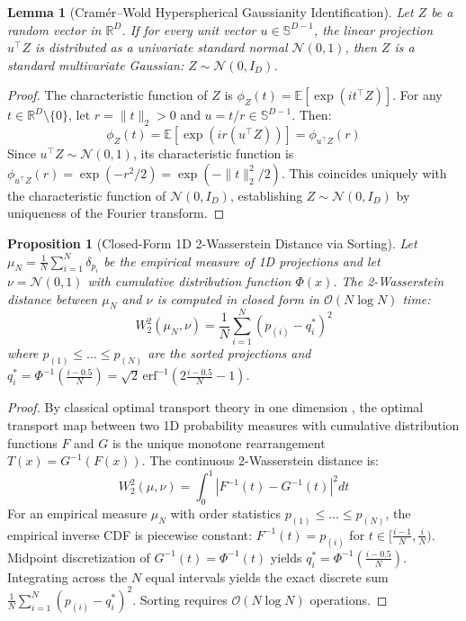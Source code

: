 \documentclass{article}
\newtheorem{lemma}{Lemma}
\newtheorem{proposition}{Proposition}
\begin{document}
\begin{lemma}[Cram\'er--Wold Hyperspherical Gaussianity Identification]
\label{lem:cramer_wold}
Let $Z$ be a random vector in $\mathbb{R}^D$. If for every unit vector $u \in \mathbb{S}^{D-1}$, the linear projection $u^\top Z$ is distributed as a univariate standard normal $\mathcal{N}(0, 1)$, then $Z$ is a standard multivariate Gaussian: $Z \sim \mathcal{N}(0, I_D)$.
\end{lemma}

\begin{proof}
The characteristic function of $Z$ is $\phi_Z(t) = \mathbb{E}[\exp(i t^\top Z)]$. For any $t \in \mathbb{R}^D \setminus \{0\}$, let $r = \|t\|_2 > 0$ and $u = t / r \in \mathbb{S}^{D-1}$. Then:
\begin{equation}
    \phi_Z(t) = \mathbb{E}[\exp(i r (u^\top Z))] = \phi_{u^\top Z}(r)
\end{equation}
Since $u^\top Z \sim \mathcal{N}(0, 1)$, its characteristic function is $\phi_{u^\top Z}(r) = \exp(-r^2 / 2) = \exp(-\|t\|_2^2 / 2)$. This coincides uniquely with the characteristic function of $\mathcal{N}(0, I_D)$, establishing $Z \sim \mathcal{N}(0, I_D)$ by uniqueness of the Fourier transform.
\end{proof}

\begin{proposition}[Closed-Form 1D 2-Wasserstein Distance via Sorting]
\label{prop:swd_sorting}
Let $\mu_N = \frac{1}{N} \sum_{i=1}^N \delta_{p_i}$ be the empirical measure of 1D projections and let $\nu = \mathcal{N}(0, 1)$ with cumulative distribution function $\Phi(x)$. The 2-Wasserstein distance between $\mu_N$ and $\nu$ is computed in closed form in $\mathcal{O}(N \log N)$ time:
\begin{equation}
    W_2^2(\mu_N, \nu) = \frac{1}{N} \sum_{i=1}^N \left( p_{(i)} - q_i^* \right)^2
\end{equation}
where $p_{(1)} \le \dots \le p_{(N)}$ are the sorted projections and $q_i^* = \Phi^{-1}\left(\frac{i - 0.5}{N}\right) = \sqrt{2}\,\text{erf}^{-1}\left(2\frac{i - 0.5}{N} - 1\right)$.
\end{proposition}

\begin{proof}
By classical optimal transport theory in one dimension \citep{villani2009optimal,bonneel2015sliced}, the optimal transport map between two 1D probability measures with cumulative distribution functions $F$ and $G$ is the unique monotone rearrangement $T(x) = G^{-1}(F(x))$. The continuous 2-Wasserstein distance is:
\begin{equation}
    W_2^2(\mu, \nu) = \int_0^1 |F^{-1}(t) - G^{-1}(t)|^2 dt
\end{equation}
For an empirical measure $\mu_N$ with order statistics $p_{(1)} \le \dots \le p_{(N)}$, the empirical inverse CDF is piecewise constant: $F^{-1}(t) = p_{(i)}$ for $t \in [\frac{i-1}{N}, \frac{i}{N})$. Midpoint discretization of $G^{-1}(t) = \Phi^{-1}(t)$ yields $q_i^* = \Phi^{-1}\left(\frac{i - 0.5}{N}\right)$. Integrating across the $N$ equal intervals yields the exact discrete sum $\frac{1}{N} \sum_{i=1}^N (p_{(i)} - q_i^*)^2$. Sorting requires $\mathcal{O}(N \log N)$ operations.
\end{proof}

\newpage

\end{document}
